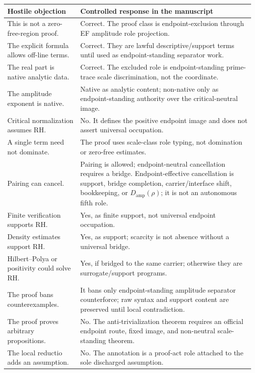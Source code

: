 \documentclass[11pt]{article}
\newcommand{\Damp}{D_{\mathrm{amp}}}
\begin{document}
\begingroup\small
\begin{longtable}{L{0.33\textwidth}L{0.57\textwidth}}
\toprule
\textbf{Hostile objection} & \textbf{Controlled response in the manuscript}\\
\midrule
This is not a zero-free-region proof. & Correct.  The proof class is endpoint-exclusion through EF amplitude role projection.\\
The explicit formula allows off-line terms. & Correct.  They are lawful descriptive/support terms until used as endpoint-standing separator work.\\
The real part is native analytic data. & Correct.  The excluded role is endpoint-standing prime-trace scale discrimination, not the coordinate.\\
The amplitude exponent is native. & Native as analytic content; non-native only as endpoint-standing authority over the critical-neutral image.\\
Critical normalization assumes RH. & No.  It defines the positive endpoint image and does not assert universal occupation.\\
A single term need not dominate. & The proof uses scale-class role typing, not domination or zero-free estimates.\\
Pairing can cancel. & Pairing is allowed; endpoint-neutral cancellation requires a bridge.  Endpoint-effective cancellation is support, bridge completion, carrier/interface shift, bookkeeping, or \(\Damp(\rho)\); it is not an autonomous fifth role.\\
Finite verification supports RH. & Yes, as finite support, not universal endpoint occupation.\\
Density estimates support RH. & Yes, as support; scarcity is not absence without a universal bridge.\\
Hilbert--Polya or positivity could solve RH. & Yes, if bridged to the same carrier; otherwise they are surrogate/support programs.\\
The proof bans counterexamples. & It bans only endpoint-standing amplitude separator counterforce; raw syntax and support content are preserved until local contradiction.\\
The proof proves arbitrary propositions. & No.  The anti-trivialization theorem requires an official endpoint route, fixed image, and non-neutral scale-standing theorem.\\
The local reductio adds an assumption. & No.  The annotation is a proof-act role attached to the sole discharged assumption.\\

\end{longtable}
\end{document}
